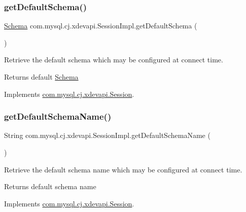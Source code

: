\subsubsection{\texorpdfstring{get\+Default\+Schema()}{getDefaultSchema()}}
{\footnotesize\ttfamily \mbox{\hyperlink{interfacecom_1_1mysql_1_1cj_1_1xdevapi_1_1_schema}{Schema}} com.\+mysql.\+cj.\+xdevapi.\+Session\+Impl.\+get\+Default\+Schema (\begin{DoxyParamCaption}{ }\end{DoxyParamCaption})}

Retrieve the default schema which may be configured at connect time.

\begin{DoxyReturn}{Returns}
default \mbox{\hyperlink{interfacecom_1_1mysql_1_1cj_1_1xdevapi_1_1_schema}{Schema}} 
\end{DoxyReturn}


Implements \mbox{\hyperlink{interfacecom_1_1mysql_1_1cj_1_1xdevapi_1_1_session_a8ead4f7e01e906447c15d9e6ce38ead2}{com.\+mysql.\+cj.\+xdevapi.\+Session}}.

\mbox{\label{classcom_1_1mysql_1_1cj_1_1xdevapi_1_1_session_impl_a4aa237ed5d2cfe61c302a11907533b61}} 
\subsubsection{\texorpdfstring{get\+Default\+Schema\+Name()}{getDefaultSchemaName()}}
{\footnotesize\ttfamily String com.\+mysql.\+cj.\+xdevapi.\+Session\+Impl.\+get\+Default\+Schema\+Name (\begin{DoxyParamCaption}{ }\end{DoxyParamCaption})}

Retrieve the default schema name which may be configured at connect time.

\begin{DoxyReturn}{Returns}
default schema name 
\end{DoxyReturn}


Implements \mbox{\hyperlink{interfacecom_1_1mysql_1_1cj_1_1xdevapi_1_1_session_a9c612e7b080af6467b718dcaa3081a84}{com.\+mysql.\+cj.\+xdevapi.\+Session}}.


